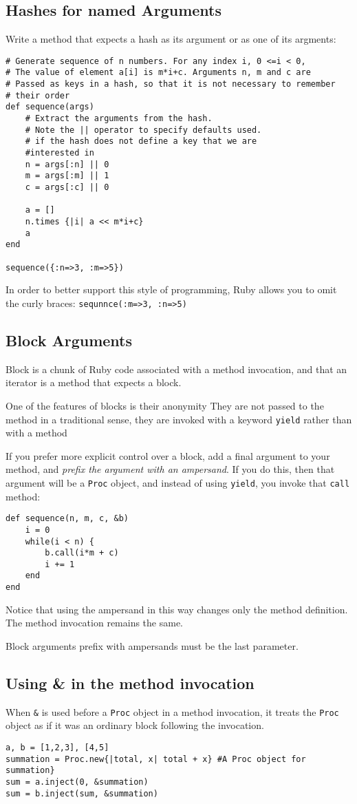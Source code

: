 \documentclass[11pt, a4paper]{book}
\begin{document}
\subsection{Hashes for named Arguments}
Write a method that expects a hash as its argument or as one of its argments:
\begin{verbatim}
# Generate sequence of n numbers. For any index i, 0 <=i < 0, 
# The value of element a[i] is m*i+c. Arguments n, m and c are
# Passed as keys in a hash, so that it is not necessary to remember
# their order
def sequence(args)
    # Extract the arguments from the hash.
    # Note the || operator to specify defaults used.
    # if the hash does not define a key that we are 
    #interested in
    n = args[:n] || 0
    m = args[:m] || 1
    c = args[:c] || 0

    a = []
    n.times {|i| a << m*i+c}
    a
end

sequence({:n=>3, :m=>5})
\end{verbatim}

In order to better support this style of programming, Ruby allows you to omit
the curly braces: \verb|sequnnce(:m=>3, :n=>5)|
\subsection{Block Arguments}
Block is a chunk of Ruby code associated with a method invocation, and that an
iterator is a method that expects a block.

One of the features of blocks is their anonymity They are not passed to the
method in a traditional sense, they are invoked with a keyword \verb|yield|
rather than with a method

If you prefer more explicit control over a block, add a final argument to your
method, and \emph{prefix the argument with an ampersand}. If you do this, then
that argument will be a \verb|Proc| object, and instead of using \verb|yield|,
you invoke that \verb|call| method:
\begin{verbatim}
def sequence(n, m, c, &b) 
    i = 0
    while(i < n) {
        b.call(i*m + c)
        i += 1
    end
end
\end{verbatim}

Notice that using the ampersand in this way changes only the method definition.
The method invocation remains the same.

Block arguments prefix with ampersands must be the last parameter.
\subsection{Using \& in the method invocation}
When \verb|&| is used before a \verb|Proc| object in a method invocation, it
treats the \verb|Proc| object as if it was an ordinary block following the
invocation.
\begin{verbatim}
a, b = [1,2,3], [4,5]
summation = Proc.new{|total, x| total + x} #A Proc object for summation}
sum = a.inject(0, &summation)
sum = b.inject(sum, &summation)
\end{verbatim}
\end{document}
